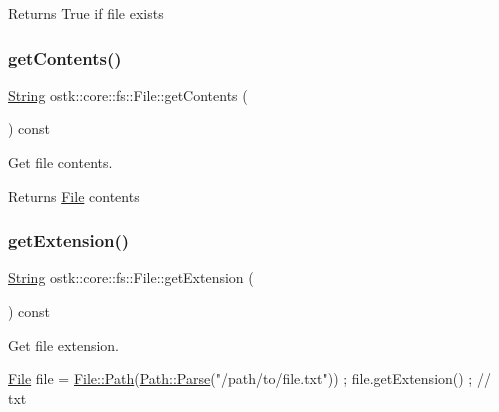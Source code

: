 \begin{DoxyReturn}{Returns}
True if file exists 
\end{DoxyReturn}
\mbox{\label{classostk_1_1core_1_1fs_1_1_file_a4ce7db90e409818e3c4d2b27884260cf}} 
\subsubsection{\texorpdfstring{get\+Contents()}{getContents()}}
{\footnotesize\ttfamily \hyperlink{classostk_1_1core_1_1types_1_1_string}{String} ostk\+::core\+::fs\+::\+File\+::get\+Contents (\begin{DoxyParamCaption}{ }\end{DoxyParamCaption}) const}



Get file contents. 

\begin{DoxyReturn}{Returns}
\hyperlink{classostk_1_1core_1_1fs_1_1_file}{File} contents 
\end{DoxyReturn}
\mbox{\label{classostk_1_1core_1_1fs_1_1_file_a91123937e378c905d973998e13b61493}} 
\subsubsection{\texorpdfstring{get\+Extension()}{getExtension()}}
{\footnotesize\ttfamily \hyperlink{classostk_1_1core_1_1types_1_1_string}{String} ostk\+::core\+::fs\+::\+File\+::get\+Extension (\begin{DoxyParamCaption}{ }\end{DoxyParamCaption}) const}



Get file extension. 


\begin{DoxyCode}
\hyperlink{classostk_1_1core_1_1fs_1_1_file_ad1695224996950be9962b8457da369b3}{File} file = \hyperlink{classostk_1_1core_1_1fs_1_1_file_ad677c6a3edc1e88c18226edebff1da03}{File::Path}(\hyperlink{classostk_1_1core_1_1fs_1_1_path_ad08539ba654f5df11c4bcb07276345ad}{Path::Parse}(\textcolor{stringliteral}{"/path/to/file.txt"})) ;
file.getExtension() ; \textcolor{comment}{// txt}
\end{DoxyCode}


